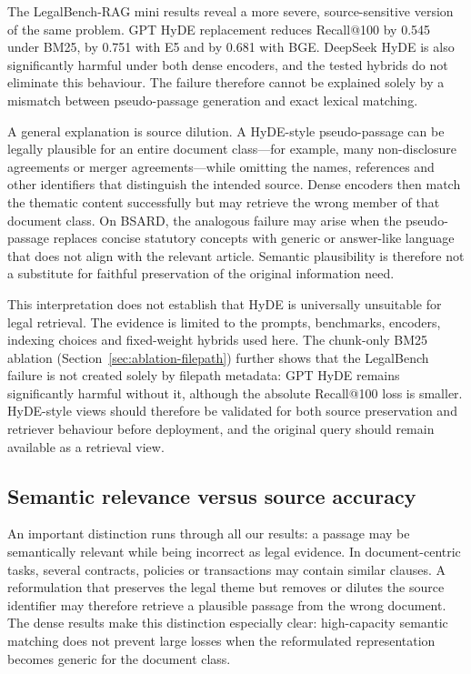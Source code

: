 \documentclass[a4paper,fleqn]{cas-dc}
\begin{document}
The LegalBench-RAG mini results reveal a more severe,
source-sensitive version of the same problem. GPT HyDE
replacement reduces Recall@100 by 0.545 under BM25, by 0.751
with E5 and by 0.681 with BGE. DeepSeek HyDE is also
significantly harmful under both dense encoders, and the tested
hybrids do not eliminate this behaviour. The failure therefore
cannot be explained solely by a mismatch between pseudo-passage
generation and exact lexical matching.

A general explanation is source dilution. A HyDE-style
pseudo-passage can be legally plausible for an entire document
class---for example, many non-disclosure agreements or merger
agreements---while omitting the names, references and other
identifiers that distinguish the intended source. Dense encoders
then match the thematic content successfully but may retrieve the
wrong member of that document class. On BSARD, the analogous
failure may arise when the pseudo-passage replaces concise
statutory concepts with generic or answer-like language that
does not align with the relevant article. Semantic plausibility
is therefore not a substitute for faithful preservation of the
original information need.

This interpretation does not establish that HyDE is universally
unsuitable for legal retrieval. The evidence is limited to the
prompts, benchmarks, encoders, indexing choices and fixed-weight
hybrids used here. The chunk-only BM25 ablation
(Section~\ref{sec:ablation-filepath}) further shows that the
LegalBench failure is not created solely by filepath metadata:
GPT HyDE remains significantly harmful without it, although the
absolute Recall@100 loss is smaller. HyDE-style views should
therefore be validated for both source preservation and retriever
behaviour before deployment, and the original query should remain
available as a retrieval view.

\subsection{Semantic relevance versus source accuracy}
\label{sec:disc-source-correctness}
An important distinction runs through all our results: a passage may be semantically relevant while being incorrect as legal evidence. In document-centric tasks, several contracts, policies or transactions may contain similar clauses. A reformulation that preserves the legal theme but removes or dilutes the source identifier may therefore retrieve a plausible passage from the wrong document. The dense results make this distinction especially clear: high-capacity semantic matching does not prevent large losses when the reformulated representation becomes generic for the document class.
\end{document}
